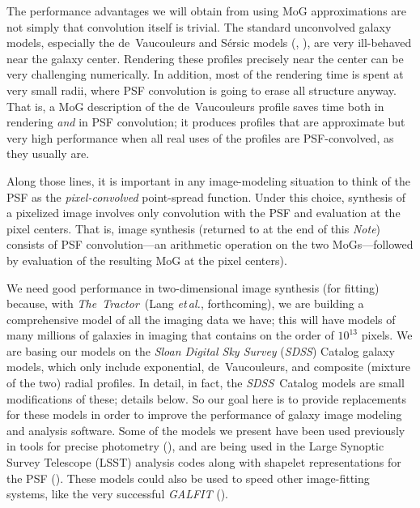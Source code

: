 \documentclass[12pt,pdftex,preprint]{aastex}
\newcommand{\foreign}[1]{\textit{#1}}
\newcommand{\etal}{\foreign{et\,al.}}
\newcommand{\documentname}{\textsl{Note}}
\newcommand{\project}[1]{\textsl{#1}}
\newcommand{\thetractor}{\project{The~Tractor}}
\newcommand{\sdss}{\project{SDSS}}
\begin{document}
The performance advantages we will obtain from using MoG
approximations are not simply that convolution itself is trivial.  The
standard unconvolved galaxy models, especially the de~Vaucouleurs and
S\'ersic models (\citealt{dev}, \citealt{ser}), are very ill-behaved
near the galaxy center.  Rendering these profiles precisely near the
center can be very challenging numerically.  In addition, most of the
rendering time is spent at very small radii, where PSF convolution is
going to erase all structure anyway.  That is, a MoG description of
the de~Vaucouleurs profile saves time both in rendering \emph{and} in
PSF convolution; it produces profiles that are approximate but very
high performance when all real uses of the profiles are PSF-convolved,
as they usually are.

Along those lines, it is important in any image-modeling situation to
think of the PSF as the \emph{pixel-convolved} point-spread function.
Under this choice, synthesis of a pixelized image involves only
convolution with the PSF and evaluation at the pixel centers.  That
is, image synthesis (returned to at the end of this \documentname)
consists of PSF convolution---an arithmetic operation on the two
MoGs---followed by evaluation of the resulting MoG at the pixel
centers).

We need good performance in two-dimensional image synthesis (for
fitting) because, with \thetractor\ (Lang \etal, forthcoming), we are
building a comprehensive model of all the imaging data we have; this
will have models of many millions of galaxies in imaging that contains
on the order of $10^{13}$ pixels.  We are basing our models on the
\project{Sloan Digital Sky Survey} (\sdss) Catalog galaxy models,
which only include exponential, de~Vaucouleurs, and composite (mixture
of the two) radial profiles.  In detail, in fact, the \sdss\ Catalog
models are small modifications of these; details
below.  So our goal here is to provide replacements for these models
in order to improve the performance of galaxy image modeling and
analysis software.  Some of the models we present have been used
previously in tools for precise photometry (\citealt{bundy}), and are
being used in the Large Synoptic Survey Telescope (LSST) analysis
codes along with shapelet representations for the PSF
(\citealt{bosch}).  These models could also be used to speed other
image-fitting systems, like the very successful \project{GALFIT}
(\citealt{galfit}).
\end{document}
